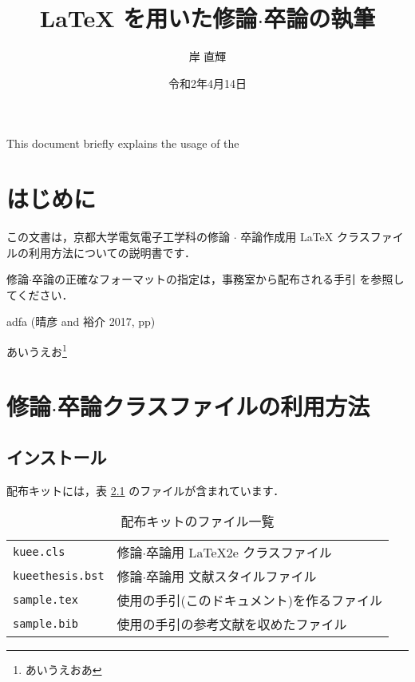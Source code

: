 \documentclass[
  sotsuron]{kuee}
\title{LaTeX を用いた修論$\cdot$卒論の執筆}
\author{岸 直輝}
\date{令和2年4月14日}
\date{}
\begin{document}
\maketitle

\begin{eabstract}This document briefly explains the usage of the\end{eabstract}

\def\lstlistingname{ソースコード}

{
        \setcounter{tocdepth}{2}
    \tableofcontents
  }
\hypertarget{ux306fux3058ux3081ux306b}{%
\chapter{はじめに}\label{ux306fux3058ux3081ux306b}}

この文書は，京都大学電気電子工学科の修論 \(\cdot\) 卒論作成用 \LaTeX
クラスファイルの利用方法についての説明書です．

修論\(\cdot\)卒論の正確なフォーマットの指定は，事務室から配布される手引
を参照してください．

\cite{GuideBook}

adfa (晴彦 and 裕介 2017, pp)

あいうえお\footnote{あいうえおあ}

\hypertarget{ux4feeux8ad6cdotux5352ux8ad6ux30afux30e9ux30b9ux30d5ux30a1ux30a4ux30ebux306eux5229ux7528ux65b9ux6cd5}{%
\chapter{\texorpdfstring{修論\(\cdot\)卒論クラスファイルの利用方法}{修論\textbackslash cdot卒論クラスファイルの利用方法}}\label{ux4feeux8ad6cdotux5352ux8ad6ux30afux30e9ux30b9ux30d5ux30a1ux30a4ux30ebux306eux5229ux7528ux65b9ux6cd5}}

\hypertarget{ux30a4ux30f3ux30b9ux30c8ux30fcux30eb}{%
\section{インストール}\label{ux30a4ux30f3ux30b9ux30c8ux30fcux30eb}}

配布キットには，表 \ref{tab:kit} のファイルが含まれています．

\begin{table}
  \caption{配布キットのファイル一覧}\label{tab:kit}
  \begin{center}
    \begin{tabular}{ll}
      \verb+kuee.cls+ & 修論$\cdot$卒論用 \LaTeX2e{} クラスファイル       \\
      \verb+kueethesis.bst+ & 修論$\cdot$卒論用 文献スタイルファイル \\
      \verb+sample.tex+ & 使用の手引(このドキュメント)を作るファイル        \\
      \verb+sample.bib+ & 使用の手引の参考文献を収めたファイル              \\
    \end{tabular}
  \end{center}
\end{table}
\end{document}
